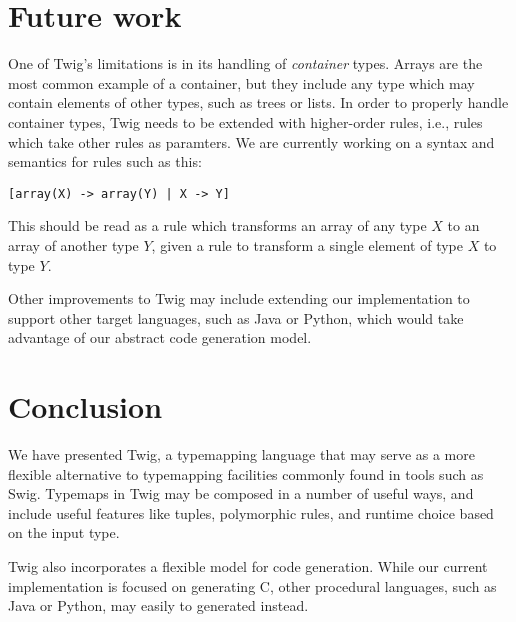 
\section{Future work}

One of Twig's limitations is in its handling of \emph{container} types. Arrays are the most common example of a container, but they include any type which may contain elements of other types, such as trees or lists. In order to properly handle container types, Twig needs to be extended with higher-order rules, i.e., rules which take other rules as paramters. We are currently working on a syntax and semantics for rules such as this:

\begin{verbatim}
[array(X) -> array(Y) | X -> Y]
\end{verbatim}

This should be read as a rule which transforms an array of any type $X$ to an array of another type $Y$, given a rule to transform a single element of type $X$ to type $Y$.

Other improvements to Twig may include extending our implementation to support other target languages, such as Java or Python, which would take advantage of our abstract code generation model.

\section{Conclusion}

We have presented Twig, a typemapping language that may serve as a more flexible alternative to typemapping facilities commonly found in tools such as Swig. Typemaps in Twig may be composed in a number of useful ways, and include useful features like tuples, polymorphic rules, and runtime choice based on the input type.

Twig also incorporates a flexible model for code generation. While our current implementation is focused on generating C, other procedural languages, such as Java or Python, may easily to generated instead.
